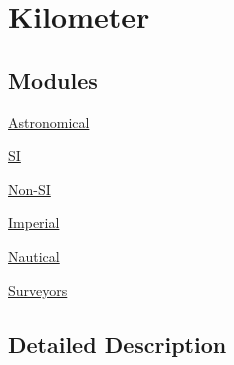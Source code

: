 \hypertarget{group___e_g_x_math-_conversions-_length_conversions-_kilometer}{}\section{Kilometer}
\label{group___e_g_x_math-_conversions-_length_conversions-_kilometer}
\subsection*{Modules}
\begin{DoxyCompactItemize}
\item 
\mbox{\hyperlink{group___e_g_x_math-_conversions-_length_conversions-_kilometer-_astronomical}{Astronomical}}
\item 
\mbox{\hyperlink{group___e_g_x_math-_conversions-_length_conversions-_kilometer-_s_i}{SI}}
\item 
\mbox{\hyperlink{group___e_g_x_math-_conversions-_length_conversions-_kilometer-_non-_s_i}{Non-\/\+SI}}
\item 
\mbox{\hyperlink{group___e_g_x_math-_conversions-_length_conversions-_kilometer-_imperial}{Imperial}}
\item 
\mbox{\hyperlink{group___e_g_x_math-_conversions-_length_conversions-_kilometer-_nautical}{Nautical}}
\item 
\mbox{\hyperlink{group___e_g_x_math-_conversions-_length_conversions-_kilometer-_surveyors}{Surveyors}}
\end{DoxyCompactItemize}


\subsection{Detailed Description}
